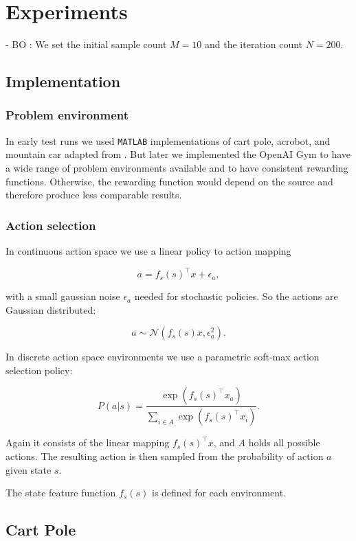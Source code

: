 \chapter{Experiments}
\label{chap:4}

- BO : We set the initial sample count $M = 10$ and the iteration count $N = 200$.

\section{Implementation}

\subsection{Problem environment}
In early test runs we used \texttt{MATLAB} implementations of cart pole, acrobot, and mountain car adapted from \cite{joseCode}. But later we implemented the OpenAI Gym to have a wide range of problem environments available and to have consistent rewarding functions. Otherwise, the rewarding function would depend on the source and therefore produce less comparable results.






\subsection{Action selection}

In continuous action space we use a linear policy to action mapping

$$a = f_s(s)^\top x + \epsilon_a,$$

with a small gaussian noise $\epsilon_a$ needed for stochastic policies. So the actions are Gaussian distributed:

$$a \sim \mathcal{N}(f_s(s) x,\epsilon_a^2).$$

In discrete action space environments we use a parametric soft-max action selection policy:

$$P(a|s)= \frac{\exp(f_s(s)^\top x_a)}{\sum_{i\in A} \exp(f_s(s)^\top x_i)}.$$

Again it consists of the linear mapping $f_s(s)^\top x$, and $A$ holds all possible actions. The resulting action is then sampled from the probability of action $a$ given state $s$.

The state feature function $f_s(s)$ is defined for each environment.

\section{Cart Pole}

